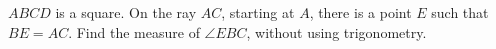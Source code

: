 $ABCD$ is a square. On the ray $AC$, starting at $A$, there is a point $E$ such that $BE=AC$. Find the measure of $\angle EBC$, without using trigonometry.
